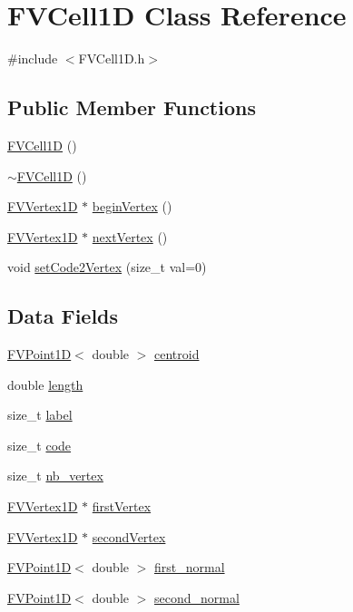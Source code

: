 \hypertarget{classFVCell1D}{
\section{FVCell1D Class Reference}
\label{dc/df2/classFVCell1D}
}


{\ttfamily \#include $<$FVCell1D.h$>$}

\subsection*{Public Member Functions}
\begin{DoxyCompactItemize}
\item 
\hyperlink{classFVCell1D_a6383b88a96eb8a8ca85c8e9f5ba17748}{FVCell1D} ()
\item 
\hyperlink{classFVCell1D_a0ddd36288947988899310777d6f79e21}{$\sim$FVCell1D} ()
\item 
\hyperlink{classFVVertex1D}{FVVertex1D} $\ast$ \hyperlink{classFVCell1D_ad4fad0e0941476b665cf09b20c6f3d93}{beginVertex} ()
\item 
\hyperlink{classFVVertex1D}{FVVertex1D} $\ast$ \hyperlink{classFVCell1D_ab7a9cc3e82cb21cd210ff298bb9b4794}{nextVertex} ()
\item 
void \hyperlink{classFVCell1D_a0a47b3287cfccb79cba1552f3ad1e7b9}{setCode2Vertex} (size\_\-t val=0)
\end{DoxyCompactItemize}
\subsection*{Data Fields}
\begin{DoxyCompactItemize}
\item 
\hyperlink{classFVPoint1D}{FVPoint1D}$<$ double $>$ \hyperlink{classFVCell1D_aaff9d346ae9979beebf810a5b6ade9ad}{centroid}
\item 
double \hyperlink{classFVCell1D_a928b11f5716331f0b89abe7d8d4124b4}{length}
\item 
size\_\-t \hyperlink{classFVCell1D_a1ec973463c76e6d9e91160720959ad68}{label}
\item 
size\_\-t \hyperlink{classFVCell1D_acf258c3b3328a96e3ee1e3b875b7874f}{code}
\item 
size\_\-t \hyperlink{classFVCell1D_a0a063e99fbc85e837d93dfbcda6f5252}{nb\_\-vertex}
\item 
\hyperlink{classFVVertex1D}{FVVertex1D} $\ast$ \hyperlink{classFVCell1D_aeb8a64ff3e2005419385cb290aeea4da}{firstVertex}
\item 
\hyperlink{classFVVertex1D}{FVVertex1D} $\ast$ \hyperlink{classFVCell1D_afae31f3f40827a0997d66b07c4a040c2}{secondVertex}
\item 
\hyperlink{classFVPoint1D}{FVPoint1D}$<$ double $>$ \hyperlink{classFVCell1D_ab9bb84e59374f4fbdeb16ba2e4c22fed}{first\_\-normal}
\item 
\hyperlink{classFVPoint1D}{FVPoint1D}$<$ double $>$ \hyperlink{classFVCell1D_afcc978d58cef2439dc0587b60e3fb727}{second\_\-normal}
\end{DoxyCompactItemize}


